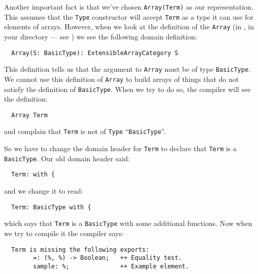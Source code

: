 Another important fact is that we've chosen \verb"Array(Term)"
as our representation.
This assumes that the \verb"Type" constructor 
will accept \verb"Term" as a type it can use 
for elements of arrays. However, when we look at the definition of the 
\verb"Array" (in , in your \asharp{}
 directory --- see ) we 
see the following domain definition:

\begin{small}
\begin{verbatim}
  Array(S: BasicType): ExtensibleArrayCategory S
\end{verbatim}
\end{small}

This definition tells us that the argument to
\verb"Array" must be of type \verb"BasicType".
We cannot use this definition of \verb"Array"
to build arrays of things that do not
satisfy the definition of \verb"BasicType".
When we try to do so, the compiler will
see the definition:

\begin{small}
\begin{verbatim}
  Array Term
\end{verbatim}
\end{small}

and complain that \verb"Term" is not of \verb"Type" ``\verb"BasicType"''. 

So we have to change the domain header for \verb"Term" to declare that \verb"Term"
is a \verb"BasicType". Our old domain header said:

\begin{small}
\begin{verbatim}
  Term: with {
\end{verbatim}
\end{small}

and we change it to read:

\begin{small}
\begin{verbatim}
  Term: BasicType with {
\end{verbatim}
\end{small}

which says that \verb"Term" is a \verb"BasicType" with some additional functions.
Now when we try to compile it the compiler says:

\begin{small}%
\begin{verbatim}
  Term is missing the following exports:
        =: (%, %) -> Boolean;   ++ Equality test.
        sample: %;              ++ Example element.
\end{verbatim}
\end{small}

